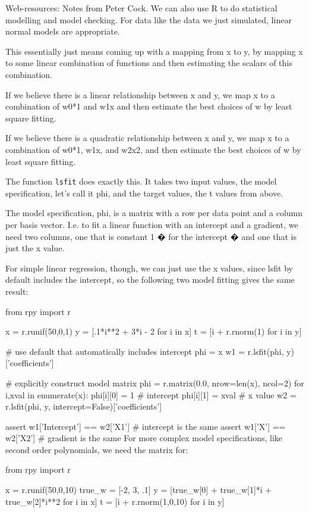 Web-resources:
Notes from Peter Cock.
We can also use R to do statistical modelling and model checking.
For data like the data we just simulated, linear normal models are appropriate.

This essentially just means coming up with a mapping from x to y, by mapping x to some linear combination of functions and then estimating the scalars of this combination.

If we believe there is a linear relationship between x and y, we map x to a combination of w0*1 and w1x and then estimate the best choices of w by least square fitting.

If we believe there is a quadratic relationship between x and y, we map x to a combination of w0*1, w1x, and w2x2, and then estimate the best choices of w by least square fitting.

The function \texttt{lsfit} does exactly this. It takes two input values, the model specification, let's call it phi, and the target values, the t values from above.

The model specification, phi, is a matrix with a row per data point and a column per basis vector. I.e. to fit a linear function with an intercept and a gradient, we need two columns, one that is constant 1 � for the intercept � and one that is just the x value.

For simple linear regression, though, we can just use the x values, since lsfit by default includes the intercept, so the following two model fitting gives the same result:

from rpy import r

x = r.runif(50,0,1)
y = [.1*i**2 + 3*i - 2 for i in x]
t = [i + r.rnorm(1) for i in y]

# use default that automatically includes intercept
phi = x
w1 = r.lsfit(phi, y)['coefficients']

# explicitly construct model matrix
phi = r.matrix(0.0, nrow=len(x), ncol=2)
for i,xval in enumerate(x):
    phi[i][0] = 1                       # intercept
    phi[i][1] = xval                    # x value
w2 = r.lsfit(phi, y, intercept=False)['coefficients']

assert w1['Intercept'] == w2['X1']      # intercept is the same
assert w1['X'] == w2['X2']              # gradient is the same
For more complex model specifications, like second order polynomials, we need the matrix for:

from rpy import r

x = r.runif(50,0,10)
true_w = [-2, 3, .1]
y = [true_w[0] + true_w[1]*i + true_w[2]*i**2 for i in x]
t = [i + r.rnorm(1,0,10) for i in y]


